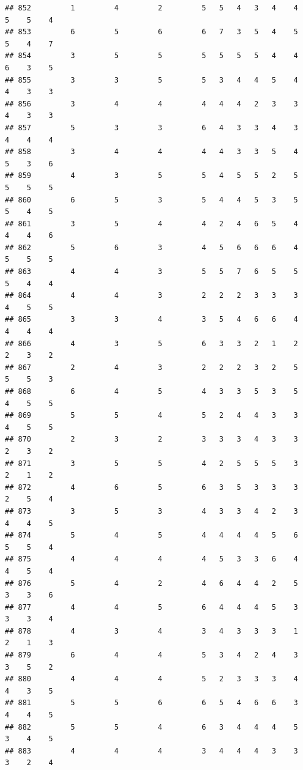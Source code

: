 \documentclass[
]{article}
\begin{document}
\begin{verbatim}
## 852         1         4         2         5   5   4   3   4    4    5    5    4
## 853         6         5         6         6   7   3   5   4    5    5    4    7
## 854         3         5         5         5   5   5   5   4    4    6    3    5
## 855         3         3         5         5   3   4   4   5    4    4    3    3
## 856         3         4         4         4   4   4   2   3    3    4    3    3
## 857         5         3         3         6   4   3   3   4    3    4    4    4
## 858         3         4         4         4   4   3   3   5    4    5    3    6
## 859         4         3         5         5   4   5   5   2    5    5    5    5
## 860         6         5         3         5   4   4   5   3    5    5    4    5
## 861         3         5         4         4   2   4   6   5    4    4    4    6
## 862         5         6         3         4   5   6   6   6    4    5    5    5
## 863         4         4         3         5   5   7   6   5    5    5    4    4
## 864         4         4         3         2   2   2   3   3    3    4    5    5
## 865         3         3         4         3   5   4   6   6    4    4    4    4
## 866         4         3         5         6   3   3   2   1    2    2    3    2
## 867         2         4         3         2   2   2   3   2    5    5    5    3
## 868         6         4         5         4   3   3   5   3    5    4    5    5
## 869         5         5         4         5   2   4   4   3    3    4    5    5
## 870         2         3         2         3   3   3   4   3    3    2    3    2
## 871         3         5         5         4   2   5   5   5    3    2    1    2
## 872         4         6         5         6   3   5   3   3    3    2    5    4
## 873         3         5         3         4   3   3   4   2    3    4    4    5
## 874         5         4         5         4   4   4   4   5    6    5    5    4
## 875         4         4         4         4   5   3   3   6    4    4    5    4
## 876         5         4         2         4   6   4   4   2    5    3    3    6
## 877         4         4         5         6   4   4   4   5    3    3    3    4
## 878         4         3         4         3   4   3   3   3    1    2    1    3
## 879         6         4         4         5   3   4   2   4    3    3    5    2
## 880         4         4         4         5   2   3   3   3    4    4    3    5
## 881         5         5         6         6   5   4   6   6    3    4    4    5
## 882         5         5         4         6   3   4   4   4    5    3    4    5
## 883         4         4         4         3   4   4   4   3    3    3    2    4

\end{verbatim}
\end{document}
